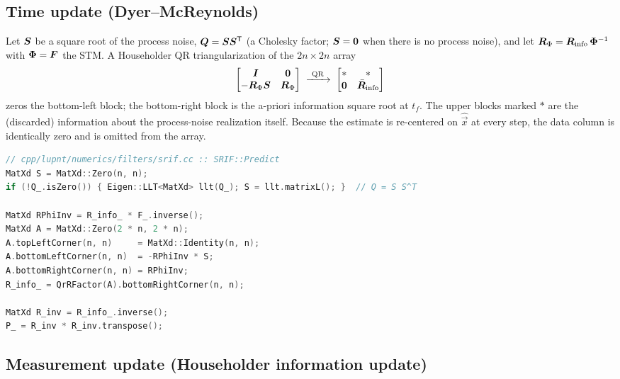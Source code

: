 \subsection{Time update (Dyer--McReynolds)}

Let $\bm{S}$ be a square root of the process noise, $\bm{Q} = \bm{S}
\bm{S}^{\mathsf{T}}$ (a Cholesky factor; $\bm{S} = \bm{0}$ when there is no
process noise), and let $\bm{R}_\Phi = \bm{R}_{\text{info}}\,\bm{\Phi}^{-1}$
with $\bm{\Phi} = \bm{F}$ the STM. A Householder QR triangularization of the
$2n \times 2n$ array
\begin{equation}
  \label{eq:flt-srif-time}
  \begin{bmatrix}
    \bm{I} & \bm{0} \\
    -\bm{R}_\Phi \bm{S} & \bm{R}_\Phi
  \end{bmatrix}
  \;\xrightarrow{\ \text{QR}\ }\;
  \begin{bmatrix}
    * & * \\
    \bm{0} & \bar{\bm{R}}_{\text{info}}
  \end{bmatrix}
\end{equation}
zeros the bottom-left block; the bottom-right block is the a-priori information
square root at $t_f$. The upper blocks marked $*$ are the (discarded)
information about the process-noise realization itself. Because the estimate is
re-centered on $\hat{\vec{x}}$ at every step, the data column is identically
zero and is omitted from the array.

\begin{lstlisting}[language=cpp, caption={SRIF time update.},
                   label={lst:flt-srif-predict}]
// cpp/lupnt/numerics/filters/srif.cc :: SRIF::Predict
MatXd S = MatXd::Zero(n, n);
if (!Q_.isZero()) { Eigen::LLT<MatXd> llt(Q_); S = llt.matrixL(); }  // Q = S S^T

MatXd RPhiInv = R_info_ * F_.inverse();
MatXd A = MatXd::Zero(2 * n, 2 * n);
A.topLeftCorner(n, n)     = MatXd::Identity(n, n);
A.bottomLeftCorner(n, n)  = -RPhiInv * S;
A.bottomRightCorner(n, n) = RPhiInv;
R_info_ = QrRFactor(A).bottomRightCorner(n, n);

MatXd R_inv = R_info_.inverse();
P_ = R_inv * R_inv.transpose();
\end{lstlisting}

\subsection{Measurement update (Householder information update)}


